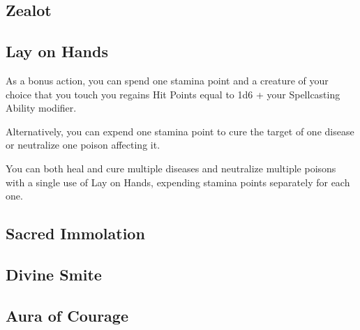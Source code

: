 
\begin{multicols*}{2}

\section{Zealot}

\subsection*{Lay on Hands}

As a bonus action, you can spend one stamina point and a creature of your choice that you touch you regains Hit Points equal to 1d6 + your Spellcasting Ability modifier.

Alternatively, you can expend one stamina point to cure the target of one disease or neutralize one poison affecting it.

You can both heal and cure multiple diseases and neutralize multiple poisons with a single use of Lay on Hands, expending stamina points separately for each one.


\subsection*{Sacred Immolation}

\subsection*{Divine Smite}

\subsection*{Aura of Courage}


\end{multicols*}
